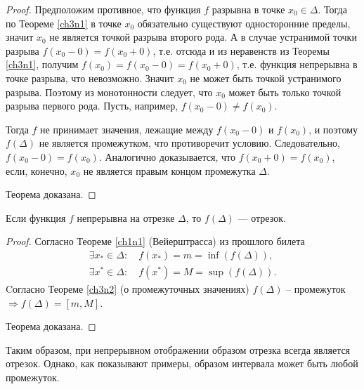 \begin{proof}
Предположим противное, что функция $f$ разрывна в точке $x_0 \in\Delta$. Тогда по Теореме \ref{ch3n1} в точке $x_0$ обязательно существуют односторонние пределы, значит $x_0$ не является точкой разрыва второго рода.  А в случае устранимой точки разрыва $f(x_0-0)=f(x_0+0)$, т.е. отсюда и из неравенств из Теоремы  \ref{ch3n1}, получим $f(x_0)=f(x_0-0)=f(x_0+0)$, т.е. функция непрерывна в точке разрыва, что невозможно. Значит $x_0$ не может быть точкой устранимого разрыва. Поэтому из монотонности следует, что $x_0$ может быть только точкой разрыва первого рода. Пусть, например, $f(x_0-0)\ne f(x_0)$.

Тогда $f$ не принимает значения, лежащие между $f(x_0 - 0)$ и $f(x_0)$, и поэтому $f(\Delta)$ не является промежутком, что противоречит условию. Следовательно, $f(x_0-0) = f(x_0)$. Аналогично доказывается, что  $f(x_0 + 0) = f(x_0)$, если, конечно, $x_0$ не является правым концом промежутка $\Delta$. 

\noindent
Теорема доказана.
\end{proof} 

\begin{thm}
Если функция $f$ непрерывна на отрезке $\Delta$, то $f(\Delta)$ — отрезок.
\end{thm}
\begin{proof}
Согласно Теореме \ref{ch1n1} (Вейерштрасса) из прошлого билета 
\begin{gather*}
\exists x_* \in \Delta:\quad f(x_*)=m=\inf(f(\Delta)),\\
\exists x^* \in \Delta:\quad f(x^*)=M=\sup(f(\Delta)).
\end{gather*}   
Cогласно Теореме \ref{ch3n2} (о промежуточных значениях) $f(\Delta)$ -- промежуток $\Rightarrow f(\Delta)=[m,M]$. 

\noindent
Теорема доказана.
\end{proof} 

Таким образом, при непрерывном отображении образом отрезка всегда является отрезок. Однако, как показывают примеры, образом интервала может быть любой промежуток.
